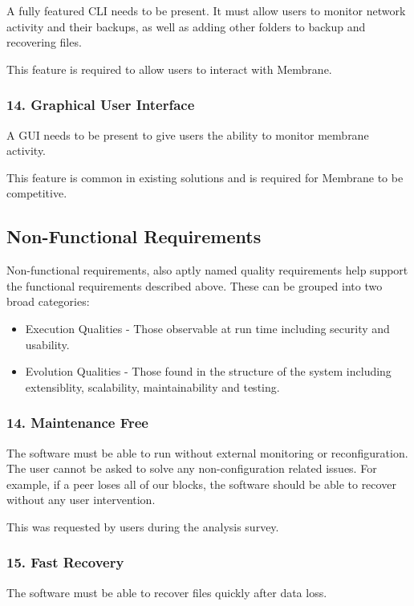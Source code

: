 \documentclass[11pt, a4paper, twoside]{report}
\begin{document}
A fully featured CLI needs to be present. It must allow users to monitor network activity and their backups, as well as adding other folders to backup and recovering files.

This feature is required to allow users to interact with Membrane.

\subsubsection{14. Graphical User Interface} \label{sec:gui-req}

A GUI needs to be present to give users the ability to monitor membrane activity.

This feature is common in existing solutions and is required for Membrane to be competitive.

\subsection{Non-Functional Requirements}

Non-functional requirements, also aptly named quality requirements help support the functional requirements described above. These can be grouped into two broad categories:
\begin{itemize}
 \item Execution Qualities - Those observable at run time including security and usability.
 \item Evolution Qualities - Those found in the structure of the system including extensiblity, scalability, maintainability and testing.
\end{itemize}

\subsubsection{14. Maintenance Free}
The software must be able to run without external monitoring or reconfiguration. The user cannot be asked to solve any non-configuration related issues. For example, if a peer loses all of our blocks, the software should be able to recover without any user intervention.

This was requested by users during the analysis survey.

\subsubsection{15. Fast Recovery}
The software must be able to recover files quickly after data loss.
\end{document}
